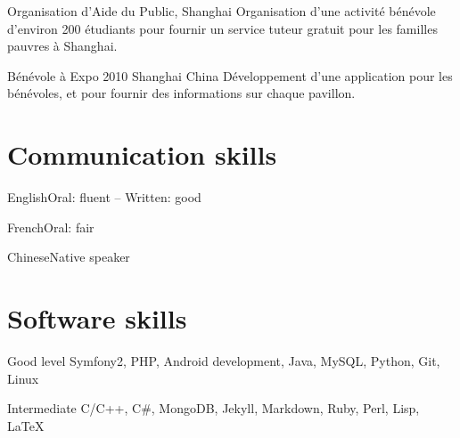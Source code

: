 \documentclass{tccv}
\begin{document}
\begin{factlist}
\item{Organisation d’Aide du Public, Shanghai}
{Organisation d’une activité bénévole d’environ 200 étudiants pour fournir un service tuteur gratuit pour les familles pauvres à Shanghai.}
\item{Bénévole à Expo 2010 Shanghai China}
{Développement d’une application pour les bénévoles, et pour fournir des informations sur chaque pavillon.}
\end{factlist}

\section{Communication skills}

\begin{factlist}
\item{English}{Oral: fluent -- Written: good}
\item{French}{Oral: fair}
\item{Chinese}{Native speaker}
\end{factlist}

\section{Software skills}

\begin{factlist}

\item{Good level}
     {Symfony2, PHP, Android development, Java, MySQL, Python, Git, Linux}

\item{Intermediate}
     {C/C++, C\#, MongoDB, Jekyll, Markdown, Ruby, Perl, Lisp, LaTeX}

\end{factlist}
\end{document}
